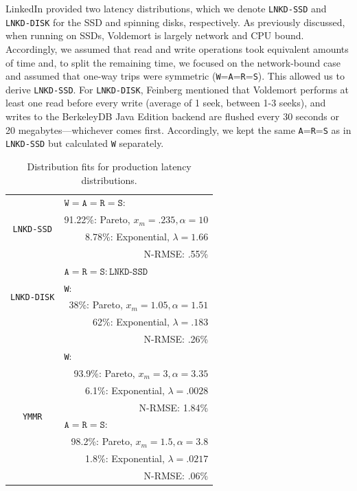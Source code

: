 \documentclass{vldb}
\begin{document}
LinkedIn provided two latency distributions, which we denote
\texttt{LNKD-SSD} and \texttt{LNKD-DISK} for the SSD and spinning
disks, respectively.  As previously discussed, when running on SSDs,
Voldemort is largely network and CPU bound.  Accordingly, we assumed
that read and write operations took equivalent amounts of time and, to
split the remaining time, we focused on the network-bound case and
assumed that one-way trips were symmetric
(\texttt{W}=\texttt{A}=\texttt{R}=\texttt{S}).  This allowed us to
derive \texttt{LNKD-SSD}.  For \texttt{LNKD-DISK}, Feinberg mentioned
that Voldemort performs at least one read before every write (average
of 1 seek, between 1-3 seeks), and writes to the BerkeleyDB Java
Edition backend are flushed every 30 seconds or 20
megabytes---whichever comes first.  Accordingly, we kept the same
\texttt{A}=\texttt{R}=\texttt{S} as in \texttt{LNKD-SSD} but
calculated \texttt{W} separately.  

\begin{table}
\centering
\begin{tabular}{|c|r|}
\hline
\multirow{4}{*}{\texttt{LNKD-SSD}} & \multicolumn{1}{|l|}{$\texttt{W} = \texttt{A}= \texttt{R} = \texttt{S}:$} \\
& 91.22\%: Pareto, $x_m=.235, \alpha=10$\\
& 8.78\%: Exponential, $\lambda = 1.66$ \\
& N-RMSE: .55\%\\\hline
\multirow{4}{*}{\texttt{LNKD-DISK}} & \multicolumn{1}{|l|}{$\texttt{A}= \texttt{R} = \texttt{S}: \texttt{LNKD-SSD}$}\\\cline{2-2}
& \multicolumn{1}{|l|}{\texttt{W}:}\\
& 38\%: Pareto, $x_m=1.05, \alpha=1.51$\\
& \hfill 62\%: Exponential, $\lambda = .183$ \\
& N-RMSE: .26\%\\
\hline
\multirow{8}{*}{\texttt{YMMR}} & \multicolumn{1}{|l|}{\texttt{W}:} \\
& 93.9\%: Pareto, $x_m=3, \alpha=3.35$\\
& 6.1\%: Exponential, $\lambda = .0028$ \\
& N-RMSE: 1.84\%\\\cline{2-2}
& \multicolumn{1}{|l|}{$\texttt{A}= \texttt{R} = \texttt{S}:$}\\
& 98.2\%: Pareto, $x_m=1.5, \alpha=3.8$\\
& 1.8\%: Exponential, $\lambda=.0217$\\
& N-RMSE: .06\%\\
\hline
\end{tabular}
\vspace{-6pt}
\caption{Distribution fits for production latency distributions.}
\vspace{-12pt}
\label{table:fits}
\end{table}
\end{document}
